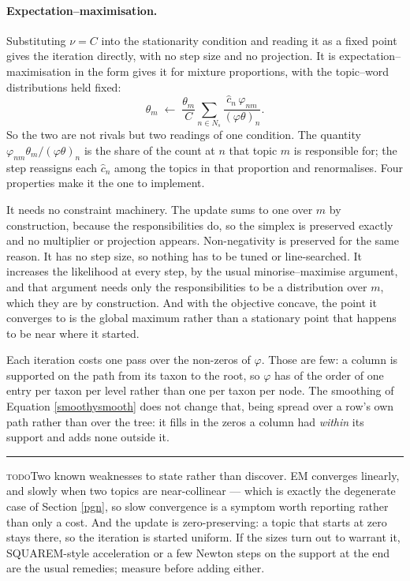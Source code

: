 \documentclass[pdflatex,sn-vancouver-num]{sn-jnl}
\newif\ifshowtodos \showtodostrue
\newcommand{\todo}[1]{%
  \ifshowtodos
    \par\addvspace{0.7\baselineskip}%
    \begin{list}{}{%
      \setlength{\leftmargin}{1.5em}%
      \setlength{\rightmargin}{1.5em}%
      \setlength{\topsep}{0pt}%
      \setlength{\partopsep}{0pt}%
      \setlength{\parsep}{0.5\baselineskip}%
      \setlength{\itemsep}{0pt}%
    }%
    \item[]\footnotesize\color{black!70}%
      \textcolor{orange!65!black}{\rule[-0.2ex]{2pt}{1.15ex}}\hspace{0.55em}%
      \textcolor{orange!65!black}{\textsc{todo}}\hspace{0.6em}\ignorespaces#1%
    \end{list}%
    \addvspace{0.7\baselineskip}%
  \fi%
}
\begin{document}
    \paragraph{Expectation--maximisation.} Substituting $\nu = C$ into the stationarity condition
    and reading it as a fixed point gives the iteration directly, with no step size and no projection.
    It is expectation--maximisation \citep{dempster1977em} in the form
    \citet{hofmann1999plsa} gives it for mixture proportions, with the topic--word distributions
    held fixed:
    \begin{equation}\label{smoothyem}
        \theta_m \;\longleftarrow\; \frac{\theta_m}{C} \sum_{n \in N_s}
            \frac{\hat{c}_n \, \varphi_{nm}}{(\varphi\theta)_n}.
    \end{equation}
    So the two are not rivals but two readings of one condition. The quantity
    $\varphi_{nm}\theta_m / (\varphi\theta)_n$ is the share of the count at $n$ that topic $m$ is responsible for;
    the step reassigns each $\hat{c}_n$ among the topics in that proportion and renormalises. Four
    properties make it the one to implement.

    It needs no constraint machinery. The update sums to one over $m$ by construction, because the
    responsibilities do, so the simplex is preserved exactly and no multiplier or projection appears.
    Non-negativity is preserved for the same reason. It has no step size, so nothing has to be tuned
    or line-searched. It increases the likelihood at every step, by the usual
    minorise--maximise argument, and that argument needs only the responsibilities to be a
    distribution over $m$, which they are by construction. And with the objective
    concave, the point it converges to is the global maximum rather than a stationary point that
    happens to be near where it started.

    Each iteration costs one pass over the non-zeros of $\varphi$. Those are few: a column is
    supported on the path from its taxon to the root, so $\varphi$ has of the order of one entry per
    taxon per level rather than one per taxon per node. The smoothing of
    Equation \eqref{smoothysmooth} does not change that, being spread over a row's own path rather
    than over the tree: it fills in the zeros a column had \emph{within} its support and adds none
    outside it.

    \todo{Two known weaknesses to state rather than discover. EM converges linearly, and slowly when
    two topics are near-collinear --- which is exactly the degenerate case of Section \ref{pgn}, so
    slow convergence is a symptom worth reporting rather than only a cost. And the update is
    zero-preserving: a topic that starts at zero stays there, so the iteration is started uniform.
    If the sizes turn out to warrant it, SQUAREM-style acceleration or a few Newton steps on the
    support at the end are the usual remedies; measure before adding either.}
\end{document}
